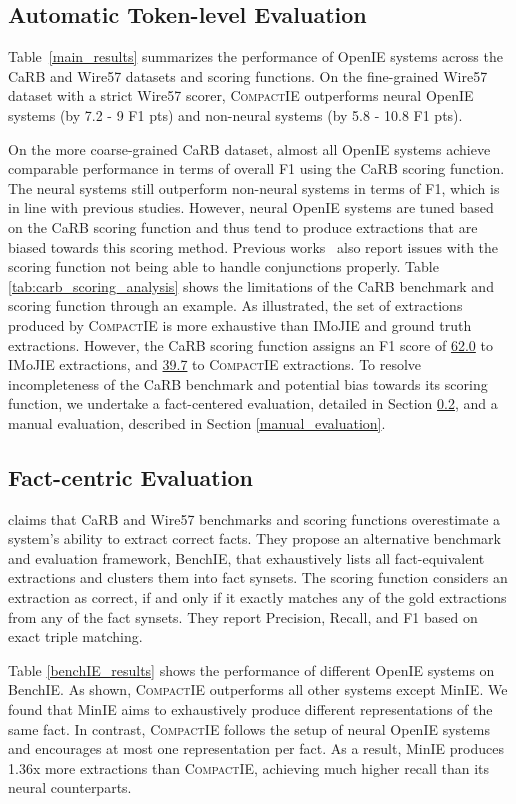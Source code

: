 \documentclass[11pt,a4paper]{article}
\newcommand{\system}{{\textsc{CompactIE}}}
\begin{document}
\subsection{Automatic Token-level Evaluation}
\label{sec:AutomaticEvaluation}
Table~\ref{main_results} summarizes the performance of OpenIE systems across the CaRB and Wire57 datasets and scoring functions. On the fine-grained Wire57 dataset with a strict Wire57 scorer, \system{} outperforms neural OpenIE systems (by 7.2 - 9 F1 pts) and non-neural systems (by 5.8 - 10.8 F1 pts). 

On the more coarse-grained CaRB dataset, almost all OpenIE systems achieve comparable performance in terms of overall F1 using the CaRB scoring function. The neural systems still outperform non-neural systems in terms of F1, which is in line with previous studies. However, neural OpenIE systems are tuned based on the CaRB scoring function and thus tend to produce extractions that are biased towards this scoring method. Previous works~\cite{openie6} also report issues with the scoring function not being able to handle conjunctions properly. Table \ref{tab:carb_scoring_analysis} shows the limitations of the CaRB benchmark and scoring function through an example. As illustrated, the set of extractions produced by \system{} is more exhaustive than IMoJIE and ground truth extractions. However, the CaRB scoring function assigns an F1 score of \underline{62.0} to IMoJIE extractions, and  \underline{39.7} to \system{} extractions. To resolve incompleteness of the CaRB benchmark and potential bias towards its scoring function, we undertake a fact-centered evaluation, detailed in Section \ref{sec:fact-centric}, and a manual evaluation, described in Section \ref{manual_evaluation}.

\subsection{Fact-centric Evaluation}
\label{sec:fact-centric}
{\cite{benchIE} claims that CaRB and Wire57 benchmarks and scoring functions overestimate a system's ability to extract correct facts. They propose an alternative benchmark and evaluation framework, BenchIE, that exhaustively lists all fact-equivalent extractions and clusters them into fact synsets. The scoring function considers an extraction as correct, if and only if it exactly matches any of the gold extractions from any of the fact synsets. They report Precision, Recall, and F1 based on exact triple matching. 

Table \ref{benchIE_results} shows the performance of different OpenIE systems on BenchIE. As shown, \system{} outperforms all other systems except MinIE. We found that MinIE aims to exhaustively produce different representations of the same fact. In contrast, \system{} follows the setup of neural OpenIE systems and encourages at most one representation per fact. As a result, MinIE produces 1.36x more extractions than \system{}, achieving much higher recall than its neural counterparts. 
}
\end{document}
